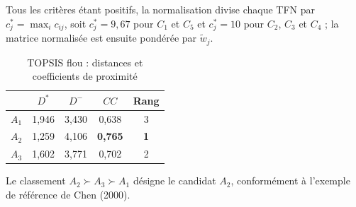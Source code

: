 \documentclass[11pt,a4paper]{report}
\theoremstyle{definition}
\theoremstyle{remark}
\begin{document}
\begin{table}[H]
\centering
\caption{TOPSIS flou : poids collectifs des critères}\label{tab:chenw}
\end{table}

\begin{table}[H]
\centering
\caption{TOPSIS flou : matrice de décision collective}\label{tab:chenx}
\end{table}

Tous les critères étant positifs, la normalisation divise chaque TFN par $c_j^*=\max_i c_{ij}$, soit
$c_j^*=9{,}67$ pour $C_1$ et $C_5$ et $c_j^*=10$ pour $C_2$, $C_3$ et $C_4$ ; la matrice normalisée est
ensuite pondérée par $\tilde w_j$.

\begin{table}[H]
\centering
\caption{TOPSIS flou : distances et coefficients de proximité}\label{tab:chencc}
\begin{tabular}{lcccc}
\toprule
 & $D^*$ & $D^-$ & $CC$ & Rang\\
\midrule
$A_1$ & 1,946 & 3,430 & 0,638 & 3\\
$A_2$ & 1,259 & 4,106 & \textbf{0,765} & \textbf{1}\\
$A_3$ & 1,602 & 3,771 & 0,702 & 2\\
\bottomrule
\end{tabular}
\end{table}

Le classement $A_2\succ A_3\succ A_1$ désigne le candidat $A_2$, conformément à l'exemple de référence de
Chen (2000).
\end{document}
